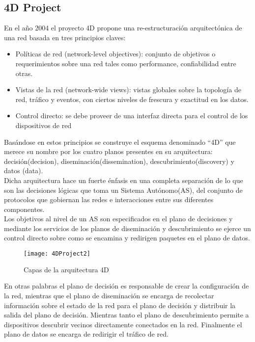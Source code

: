 \subsection{4D Project}
En el año 2004 el proyecto 4D \citep{rexford2004network}\citep{greenberg2005clean} propone una re-estructuración arquitectónica de una red basada en tres principios claves: 

\begin{itemize}
\item Políticas de red (network-level objectives): conjunto de objetivos o requerimientos sobre una red tales como performance, confiabilidad entre otras.

\item Vistas de la red (network-wide views): vistas globales sobre la topolog\'ia de red, tr\'afico y eventos, con ciertos niveles de frescura y exactitud en los datos.

\item Control directo: se debe proveer de una interfaz directa para el control de los dispositivos de red
\end{itemize}

Basándose en estos principios se construye el esquema denominado ``4D'' que merece su nombre por los cuatro planos presentes en su arquitectura: decisión(decision), diseminación(dissemination), descubrimiento(discovery) y datos (data).\\

Dicha arquitectura hace un fuerte énfasis en una completa separación de lo que son las decisiones lógicas que toma un Sistema Autónomo(AS), del conjunto de protocolos que gobiernan las redes e interacciones entre sus diferentes componentes.\\

Los objetivos al nivel de un AS son especificados en el plano de decisiones y mediante los servicios de los planos de diseminación y descubrimiento se ejerce un control directo sobre como se encamina y redirigen paquetes en el plano de datos.\\

\begin{figure}[htbp!] 
\centering    
\texttt{[image: 4DProject2]}
\caption[Capas de la arquitectura 4D]{Capas de la arquitectura 4D}
\label{fig:4DProject}
\end{figure}

En otras palabras el plano de decisión es responsable de crear la configuración de la red, mientras que el plano de diseminación se encarga de recolectar información sobre el estado de la red para el plano de decisión y distribuir la salida del plano de decisión. Mientras tanto el plano de descubrimiento permite a dispositivos descubrir vecinos directamente conectados en la red. Finalmente el plano de datos se encarga de redirigir el tráfico de red.\\ \\

